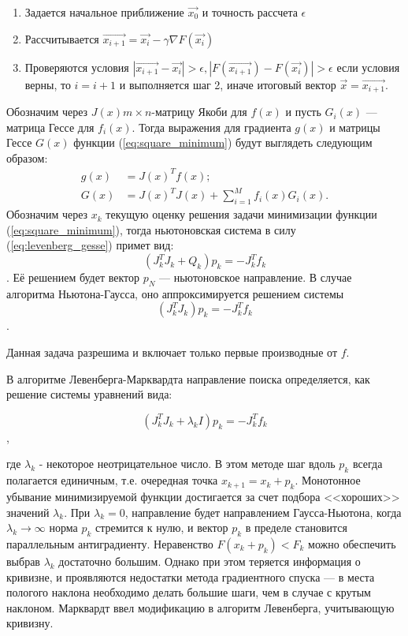 \begin{enumerate}
 \item Задается начальное приближение $\vec{x_0}$ и точность рассчета $\epsilon$
 \item Рассчитывается $ \vec{x_{i+1}} =  \vec{x_{i}} - \gamma \nabla F(\vec{x_{i}}) $
 \item Проверяются условия $\left| \vec{x_{i+1}} - \vec{x_{i}} \right| > \epsilon, \left| F(\vec{x_{i+1}}) - F(\vec{x_{i}}) \right| > \epsilon $ если условия верны, то $i = i + 1$ 
 и выполняется шаг 2, иначе итоговый вектор $ \vec{x} = \vec{x_{i+1}} $.
\end{enumerate}
Обозначим через $J(x) m \times n$-матрицу Якоби для $f(x)$ и пусть $G_i(x)$ --- 
матрица Гессе для $f_i(x)$. Тогда выражения для градиента $g(x)$ и матрицы Гессе $G(x)$ функции
(\ref{eq:square_minimum}) будут выглядеть следующим образом:
\begin{equation}
\begin{split}
 g(x) &= J(x)^T f(x); \\
 G(x) &= J(x)^T J(x) + \displaystyle \sum_{i=1}^M f_i(x) G_i(x).
\end{split}
 \label{eq:levenberg_gesse}
\end{equation}
Обозначим через $x_k$ текущую оценку решения задачи минимизации функции (\ref{eq:square_minimum}),
тогда ньютоновская система в силу (\ref{eq:levenberg_gesse}) примет вид:
\begin{equation}
 \left(J^T_k J_k + Q_k\right) p_k = -J^T_k f_k
\end{equation}.
Её решением будет вектор $p_N$ --- ньютоновское направление. В случае алгоритма Ньютона-Гаусса, оно аппроксимируется  решением системы 
\begin{equation}
 (J^T_k J_k ) p_k = -J^T_k f_k
\end{equation}.

Данная задача разрешима и включает только первые производные от $f$.

В алгоритме Левенберга-Марквардта направление поиска 
определяется, как решение системы уравнений вида:

\begin{equation}
 (J^T_k J_k + \lambda_k I) p_k = -J^T_k f_k
\end{equation},

где $\lambda_k$ - некоторое неотрицательное число. В этом методе шаг вдоль $p_k$ всегда 
полагается единичным, т.е. очередная точка $x_{k+1} = x_k + p_k$. Монотонное убывание минимизируемой
функции достигается за счет подбора <<хороших>> значений $\lambda_k$. При $\lambda_k = 0$, направление будет 
направлением Гаусса-Ньютона, когда $\lambda_k \to \infty$ норма $p_k$ стремится к нулю, и вектор
$p_k$ в пределе становится параллельным антиградиенту. Неравенство $F (x_k + p_k) < F_k$ можно обеспечить
выбрав $\lambda_k$ достаточно большим. Однако при этом теряется информация о кривизне, и проявляются
недостатки метода градиентного спуска --- в места пологого наклона необходимо делать большие шаги, чем в случае
с крутым наклоном. Марквардт ввел модификацию в алгоритм Левенберга, учитывающую кривизну.

